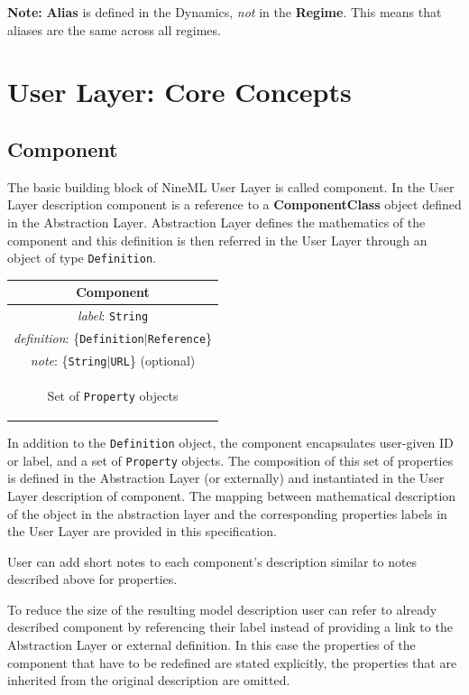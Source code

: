 \documentclass{article}
\newcommand{\note}[1]{%
\begin{center}
\colorbox{issuecolor}{\parbox{0.8\linewidth}{\textbf{Note:} #1}}
\end{center}%
}
\newcommand{\ComponentClass}{{\bf{ComponentClass}}\xspace}
\newcommand{\Alias}{{\bf{Alias}}\xspace}
\newcommand{\Regime}{{\bf{Regime}}\xspace}
\begin{document}
\note{\Alias is defined in the Dynamics, \emph{not} in the
\Regime. This means that aliases are the same across all regimes.}

\section{User Layer: Core Concepts}
\label{UserL}

\subsection{Component}

The basic building block of NineML User Layer is called component. In the
User Layer description component is a reference to a \ComponentClass
object defined in the Abstraction Layer. Abstraction Layer defines the
mathematics of the component and this definition is then referred in the
User Layer through an object of type {\tt Definition}.

\begin{table}[htb]
\center
\begin{tabular}{|c|}
\hline
\hline
Component \\
\hline
\hline
{\em label}: {\tt String} \\
\hline
{\em definition}: \{{\tt Definition}$|${\tt Reference}\}\\
\hline
{\em note}: \{{\tt String}$|${\tt URL}\} (optional)\\
\hline
\colorbox{issuecolor}{\parbox{0.4\linewidth}
{\center Set of {\tt Property} objects}} \\
\hline
\end{tabular}
\end{table}

In addition to the {\tt Definition} object, the component encapsulates
user-given ID or label, and a set of {\tt Property} objects. The composition
of this set of properties is defined in the Abstraction Layer (or externally)
and instantiated in the User Layer description of component. The mapping
between mathematical description of the object in the abstraction
layer and the corresponding properties labels in the User Layer are
provided in this specification.

User can add short notes to each component's description similar to
notes described above for properties.

To reduce the size of the resulting model description user can refer to
already described component by referencing their label instead of providing
a link to the Abstraction Layer or external definition. In this case the
properties of the component that have to be redefined are stated explicitly,
the properties that are inherited from the original description are omitted.
\end{document}
